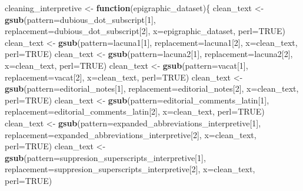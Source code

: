 \documentclass[]{article}
\newenvironment{Shaded}{\begin{snugshade}}{\end{snugshade}}
\newcommand{\ControlFlowTok}[1]{\textcolor[rgb]{0.13,0.29,0.53}{\textbf{#1}}}
\newcommand{\DataTypeTok}[1]{\textcolor[rgb]{0.13,0.29,0.53}{#1}}
\newcommand{\DecValTok}[1]{\textcolor[rgb]{0.00,0.00,0.81}{#1}}
\newcommand{\KeywordTok}[1]{\textcolor[rgb]{0.13,0.29,0.53}{\textbf{#1}}}
\newcommand{\NormalTok}[1]{#1}
\newcommand{\OtherTok}[1]{\textcolor[rgb]{0.56,0.35,0.01}{#1}}
\newcommand{\StringTok}[1]{\textcolor[rgb]{0.31,0.60,0.02}{#1}}
\begin{document}
\begin{Shaded}
\begin{Highlighting}[]
\NormalTok{cleaning_interpretive <-}\StringTok{ }\ControlFlowTok{function}\NormalTok{(epigraphic_dataset)\{}
\NormalTok{  clean_text <-}\StringTok{ }\KeywordTok{gsub}\NormalTok{(}\DataTypeTok{pattern=}\NormalTok{dubious_dot_subscript[}\DecValTok{1}\NormalTok{], }\DataTypeTok{replacement=}\NormalTok{dubious_dot_subscript[}\DecValTok{2}\NormalTok{], }\DataTypeTok{x=}\NormalTok{epigraphic_dataset, }\DataTypeTok{perl=}\OtherTok{TRUE}\NormalTok{)}
\NormalTok{  clean_text <-}\StringTok{ }\KeywordTok{gsub}\NormalTok{(}\DataTypeTok{pattern=}\NormalTok{lacuna1[}\DecValTok{1}\NormalTok{], }\DataTypeTok{replacement=}\NormalTok{lacuna1[}\DecValTok{2}\NormalTok{], }\DataTypeTok{x=}\NormalTok{clean_text, }\DataTypeTok{perl=}\OtherTok{TRUE}\NormalTok{)}
\NormalTok{  clean_text <-}\StringTok{ }\KeywordTok{gsub}\NormalTok{(}\DataTypeTok{pattern=}\NormalTok{lacuna2[}\DecValTok{1}\NormalTok{], }\DataTypeTok{replacement=}\NormalTok{lacuna2[}\DecValTok{2}\NormalTok{], }\DataTypeTok{x=}\NormalTok{clean_text, }\DataTypeTok{perl=}\OtherTok{TRUE}\NormalTok{)}
\NormalTok{  clean_text <-}\StringTok{ }\KeywordTok{gsub}\NormalTok{(}\DataTypeTok{pattern=}\NormalTok{vacat[}\DecValTok{1}\NormalTok{], }\DataTypeTok{replacement=}\NormalTok{vacat[}\DecValTok{2}\NormalTok{], }\DataTypeTok{x=}\NormalTok{clean_text, }\DataTypeTok{perl=}\OtherTok{TRUE}\NormalTok{)}
\NormalTok{  clean_text <-}\StringTok{ }\KeywordTok{gsub}\NormalTok{(}\DataTypeTok{pattern=}\NormalTok{editorial_notes[}\DecValTok{1}\NormalTok{], }\DataTypeTok{replacement=}\NormalTok{editorial_notes[}\DecValTok{2}\NormalTok{], }\DataTypeTok{x=}\NormalTok{clean_text, }\DataTypeTok{perl=}\OtherTok{TRUE}\NormalTok{)}
\NormalTok{  clean_text <-}\StringTok{ }\KeywordTok{gsub}\NormalTok{(}\DataTypeTok{pattern=}\NormalTok{editorial_comments_latin[}\DecValTok{1}\NormalTok{], }\DataTypeTok{replacement=}\NormalTok{editorial_comments_latin[}\DecValTok{2}\NormalTok{], }\DataTypeTok{x=}\NormalTok{clean_text, }\DataTypeTok{perl=}\OtherTok{TRUE}\NormalTok{)}
\NormalTok{  clean_text <-}\StringTok{ }\KeywordTok{gsub}\NormalTok{(}\DataTypeTok{pattern=}\NormalTok{expanded_abbreviations_interpretive[}\DecValTok{1}\NormalTok{], }\DataTypeTok{replacement=}\NormalTok{expanded_abbreviations_interpretive[}\DecValTok{2}\NormalTok{], }\DataTypeTok{x=}\NormalTok{clean_text, }\DataTypeTok{perl=}\OtherTok{TRUE}\NormalTok{)}
\NormalTok{ clean_text <-}\StringTok{ }\KeywordTok{gsub}\NormalTok{(}\DataTypeTok{pattern=}\NormalTok{suppresion_superscripts_interpretive[}\DecValTok{1}\NormalTok{], }\DataTypeTok{replacement=}\NormalTok{suppresion_superscripts_interpretive[}\DecValTok{2}\NormalTok{], }\DataTypeTok{x=}\NormalTok{clean_text, }\DataTypeTok{perl=}\OtherTok{TRUE}\NormalTok{)}

\end{Highlighting}
\end{Shaded}
\end{document}

